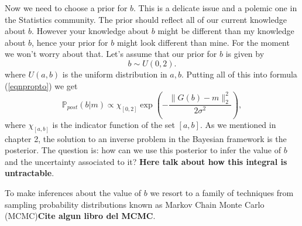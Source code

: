 \documentclass[12pt]{book}
\newcommand{\post}{\mathbb{P}_{post}}
\begin{document}
Now we need to choose a prior for $b$. This is a delicate issue and a polemic one in the Statistics community.
The prior should reflect all of our current knowledge about $b$. However your knowledge about $b$ might be 
different than my knowledge about $b$, hence your prior for $b$ might look different than mine. For
the moment  we won't worry about that. Let's assume that our prior for $b$ is given by
\begin{equation*}
b\sim U(0,2).
\end{equation*}
where $U(a,b)$ is the uniform distribution in $a,b$. Putting all of this into formula (\ref{eqnpropto}) we get
\begin{equation*}
\post(b|m)\propto\chi_{[0,2]}\exp\left(-\frac{\|G(b)-m\|_{2}^{2}}{2\sigma^{2}}\right),
\end{equation*}
where $\chi_{[a,b]}$ is the indicator function of the set $[a,b]$. As we mentioned in chapter 2,
the solution to an inverse problem in the Bayesian framework is the posterior. The question is:
how can we use this posterior to infer the value of $b$ and the uncertainty associated to it? 
\textbf{Here talk about how this integral is untractable}.

To make inferences about the value of $b$ we resort to a family of techniques from sampling probability
distributions known as Markov Chain Monte Carlo (MCMC)\textbf{Cite algun libro del MCMC}.




\end{document}
